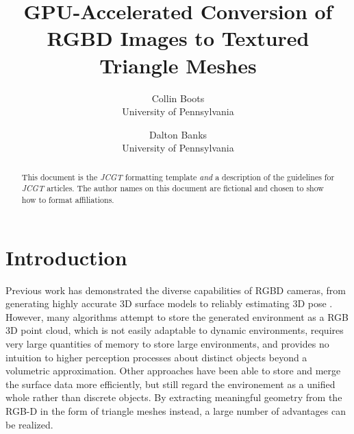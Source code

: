 \documentclass{jcgt}
\begin{document}
\title{GPU-Accelerated Conversion of RGBD Images to Textured Triangle Meshes}

\author
       {Collin Boots\\University of Pennsylvania
        \and Dalton Banks\\University of Pennsylvania
       }



\maketitle
\thispagestyle{firstpagestyle}

\begin{abstract}
\small
This document is the \textit{JCGT} formatting template \textit{and} a description of the guidelines
for  \textit{JCGT} articles.  The author names on this document are fictional and chosen to show
how to format affiliations.
\end{abstract}


\section{Introduction}
\label{sec:introduction}
Previous work has demonstrated the diverse capabilities of RGBD cameras, from generating highly accurate 3D surface models \cite{KinectFusion} to reliably estimating 3D pose \cite{Endres,Taguchi}. However, many algorithms attempt to store the generated environment as a RGB 3D point cloud, which is not easily adaptable to dynamic environments, requires very large quantities of memory to store large environments, and provides no intuition to higher perception processes about distinct objects beyond a volumetric approximation. Other approaches have been able to store and merge the surface data more efficiently, but still regard the environement as a unified whole rather than discrete objects. By extracting meaningful geometry from the RGB-D in the form of triangle meshes instead, a large number of advantages can be realized.
\end{document}
